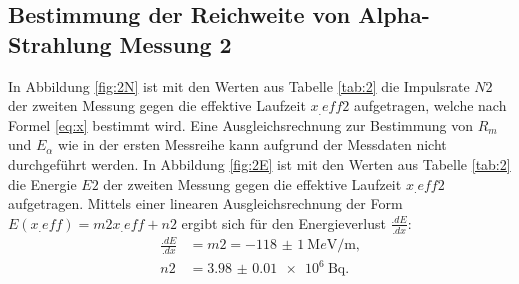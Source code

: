 \subsection{Bestimmung der Reichweite von Alpha-Strahlung Messung 2}

In Abbildung \ref{fig:2N} ist mit den Werten aus Tabelle \ref{tab:2} die Impulsrate $N2$ der zweiten Messung gegen die effektive Laufzeit $x_.{eff2}$ aufgetragen, welche nach Formel \eqref{eq:x} bestimmt wird. Eine Ausgleichsrechnung zur Bestimmung von $R_m$ und $E_\alpha$ wie in der ersten Messreihe kann aufgrund der Messdaten nicht durchgeführt werden.
In Abbildung \ref{fig:2E} ist mit den Werten aus Tabelle \ref{tab:2} die Energie $E2$ der zweiten Messung gegen die effektive Laufzeit $x_.{eff2}$ aufgetragen.
Mittels einer linearen Ausgleichsrechnung der Form $E(x_.{eff})=m2 x_.{eff} +n2$ ergibt sich für den Energieverlust $\frac{.dE}{.dx}$:
\begin{align*}
\frac{.dE}{.dx}	&= m2 = \SI{-118(1)}{\mega e\volt\per\metre}\text{,}\\
n2	&= \SI{3.98(1)e6}{\becquerel}\text{.}
\end{align*}

